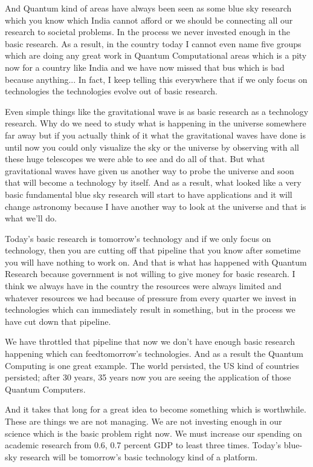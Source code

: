 \begin{multicols}{2}
And Quantum kind of areas have always been seen as some blue sky research which you know which India cannot afford or we should be connecting all our research to societal problems. In the process we never invested enough in the basic research. As a result, in the country today I cannot even name five groups which are doing any great work in Quantum Computational areas which is a pity now for a country like India and we have now missed that bus which is bad because anything... In fact, I keep telling this everywhere that if we only focus on technologies the technologies evolve out of basic research.

Even simple things like the gravitational wave is as basic research as a technology research. Why do we need to study what is happening in the universe somewhere far away but if you actually think of it what the gravitational waves have done is until now you could only visualize the sky or the universe by observing with all these huge telescopes we were able to see and do all of that. But what gravitational waves have given us another way to probe the universe and soon that will become a technology by itself. And as a result, what looked like a very basic fundamental blue sky research will start to have applications and it will change astronomy because I have another way to look at the universe and that is what we’ll do.

Today’s basic research is tomorrow’s technology and if we only focus on technology, then you are cutting off that pipeline that you know after sometime you will have nothing to work on. And that is what has happened with Quantum Research because government is not willing to give money for basic research. I think we always have in the country the resources were always limited and whatever resources we had because of pressure from every quarter we invest in technologies which can immediately result in something, but in the process we have cut down that pipeline.

We have throttled that pipeline that now we don’t have enough basic research happening which can feed\break tomorrow’s technologies. And as a result the Quantum Computing is one great example. The world persisted, the US kind of countries persisted; after 30 years, 35 years now you are seeing the application of those Quantum Computers.

And it takes that long for a great idea to become something which is worthwhile. These are things we are not managing. We are not investing enough in our science which is the basic problem right now. We must increase our spending on academic research from 0.6, 0.7 percent GDP to least three times. Today’s blue-sky research will be tomorrow’s basic technology kind of a platform.


\end{multicols}
